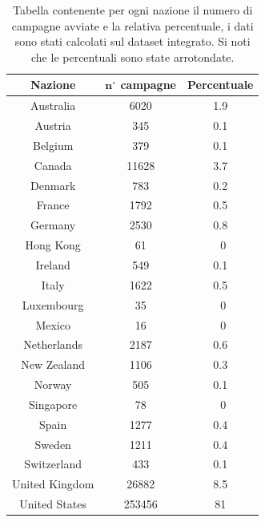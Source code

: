 \begin{table}
	\caption{Tabella contenente per ogni nazione il numero di campagne avviate e la relativa percentuale, i dati sono stati calcolati sul dataset integrato. Si noti che le percentuali sono state arrotondate.}
	
	\label{tab:prj_country}
	
	\centering
	\begin{tabular}{|c|c|c|}
		\hline
		\textbf{Nazione} & \textbf{$\mathbf{n^{\circ}}$ campagne} & \textbf{Percentuale}\\
		\hline
		Australia & 6020 & 1.9 \\
		\hline
		Austria & 345 & 0.1 \\
		\hline
		Belgium & 379 & 0.1\\
		\hline
		Canada & 11628 & 3.7\\
		\hline
		Denmark & 783 & 0.2\\
		\hline
		France & 1792 & 0.5\\
		\hline
		Germany & 2530 & 0.8\\
		\hline
		Hong Kong & 61 & ~0\\
		\hline
		Ireland & 549 & 0.1\\
		\hline
		Italy & 1622 & 0.5\\
		\hline
		Luxembourg & 35 & ~0\\
		\hline
		Mexico & 16 & ~0\\
		\hline
		Netherlands & 2187 & 0.6\\
		\hline
		New Zealand & 1106 & 0.3\\
		\hline
		Norway & 505 & 0.1\\
		\hline
		Singapore & 78 & ~0\\
		\hline
		Spain & 1277 & 0.4\\
		\hline
		Sweden & 1211 & 0.4\\
		\hline
		Switzerland & 433 & 0.1\\
		\hline
		United Kingdom & 26882 & 8.5\\
		\hline
		United States & 253456 & 81\\
		\hline
	\end{tabular}
\end{table}

